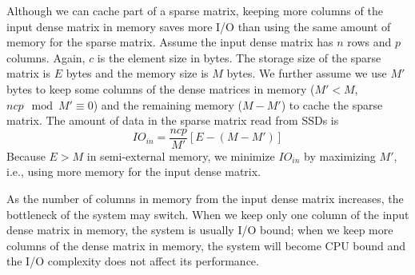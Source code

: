 Although we can cache part of a sparse matrix,
keeping more columns of the input dense matrix in memory saves more I/O than
using the same amount of memory for the sparse matrix. Assume the input
dense matrix has $n$ rows and $p$ columns. Again, $c$ is the element size
in bytes. The storage size of the sparse
matrix is $E$ bytes and the memory size is $M$ bytes. We further assume
we use $M'$ bytes to keep some columns of the dense matrices in memory
($M' < M$, ${n c p} \mod {M'} \equiv 0$)
and the remaining memory ($M - M'$) to cache the sparse matrix.
The amount of data in the sparse matrix read from SSDs is
\begin{equation*}
IO_{in} = \frac{n c p}{M'} [E - (M - M')]
\end{equation*}
Because $E > M$ in semi-external memory, we minimize $IO_{in}$ by maximizing $M'$,
i.e., using more memory for the input dense matrix.

As the number of columns in memory from the input dense matrix increases,
the bottleneck of the system
may switch. When we keep only one column of the input dense matrix in memory,
the system is usually I/O bound; when we keep more columns of the dense matrix
in memory, the system will become CPU bound and the I/O complexity does not
affect its performance.



